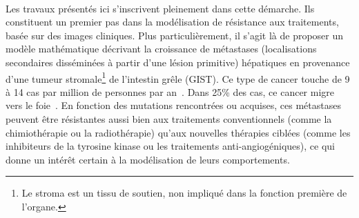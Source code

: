 \documentclass[main.tex]{subfiles}
\begin{document}
\paragraph{}
Les travaux présentés ici s'inscrivent pleinement dans cette démarche. Ils constituent un premier pas dans la modélisation de résistance aux traitements, basée sur des images cliniques. 
Plus particulièrement, il s'agit là de proposer un modèle mathématique décrivant la croissance de métastases 
(localisations secondaires disséminées à partir d’une lésion primitive)
hépatiques en provenance d'une  
tumeur stromale\footnote{Le stroma est un tissu de soutien, non impliqué dans la fonction première de l'organe.} de l'intestin grêle
(GIST).
Ce type de cancer touche de 9 à 14 cas par million de personnes par an~\cite{Nilsson2005}. Dans 25\% des cas, ce cancer migre vers le foie~\cite{Nilsson2005}. 
En fonction des mutations rencontrées ou acquises, ces métastases peuvent être résistantes aussi bien aux traitements conventionnels (comme la chimiothérapie ou la radiothérapie) qu'aux nouvelles thérapies ciblées (comme les inhibiteurs de la tyrosine kinase ou les traitements anti-angiogéniques), ce qui donne un intérêt certain à la modélisation de leurs comportements. 
\end{document}
